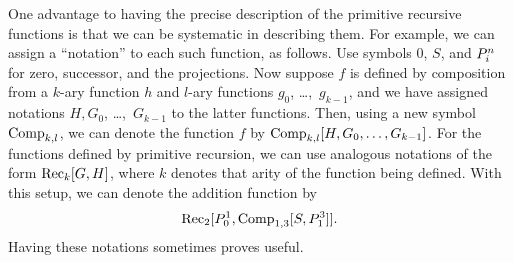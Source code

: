\documentclass[../../../include/open-logic-section]{subfiles}
\begin{document}
\begin{explain}
One advantage to having the precise description of the primitive
recursive functions is that we can be systematic in describing them.
For example, we can assign a ``notation'' to each such function, as
follows. Use symbols $0$, $S$, and $P^{n}_{i}$ for zero, successor, and
the projections. Now suppose $f$ is defined by composition from a
$k$-ary function $h$ and $l$-ary functions $g_0$, \dots,~$g_{k-1}$, and
we have assigned notations $H,G_0$, \dots,~$G_{k-1}$ to the latter
functions. Then, using a new symbol $\mathrm{Comp}_{k,l}$, we can denote
the function $f$ by $\mathrm{Comp}_{k,l}[H,G_0,\dots,G_{k-1}]$. For the
functions defined by primitive recursion, we can use analogous
notations of the form $\mathrm{Rec}_k[G,H]$, where $k$ denotes that arity
of the function being defined. With this setup, we can denote the
addition function by
\[
\mathrm{Rec}_2[P^{1}_{0},\mathrm{Comp}_{1,3}[S,P^{3}_{1}]].
\]
Having these notations sometimes proves useful.
\end{explain}
\end{document}
